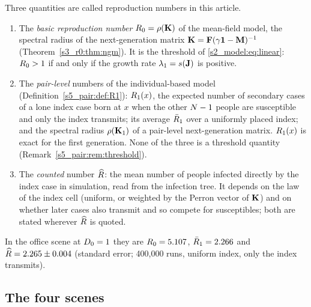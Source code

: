 Three quantities are called reproduction numbers in this article.
\begin{enumerate}
  \item The \emph{basic reproduction number} $R_0=\rho(\mathbf{K})$ of the mean-field model, the spectral radius of
    the next-generation matrix $\mathbf{K}=\mathbf{F}(\gamma\mathbf{1}-\mathbf{M})^{-1}$ (Theorem~\ref{s3_r0:thm:ngm}). It is the threshold
    of \eqref{s2_model:eq:linear}: $R_0>1$ if and only if the growth rate $\lambda_1=s(\mathbf{J})$ is positive.
  \item The \emph{pair-level} numbers of the individual-based model (Definition~\ref{s5_pair:def:R1}):
    $R_1(x)$, the expected number of secondary cases of a lone index case born at $x$ when the other
    $N-1$ people are susceptible and only the index transmits; its average $\bar{R}_1$ over a uniformly
    placed index; and the spectral radius $\rho(\mathbf{K}_1)$ of a pair-level next-generation matrix. $R_1(x)$ is
    exact for the first generation. None of the three is a threshold quantity
    (Remark~\ref{s5_pair:rem:threshold}).
  \item The \emph{counted} number $\widehat{R}$: the mean number of people infected directly by the index case in
    simulation, read from the infection tree. It depends on the law of the index cell (uniform, or weighted
    by the Perron vector of $\mathbf{K}$) and on whether later cases also transmit and so compete for susceptibles;
    both are stated wherever $\widehat{R}$ is quoted.
\end{enumerate}
In the office scene at $D_0=1$ they are $R_0=5.107$, $\bar{R}_1=2.266$ and $\widehat{R}=2.265\pm0.004$ (standard
error; 400{,}000 runs, uniform index, only the index transmits).

\subsection{The four scenes}\label{s2_model:sec:scenes}

